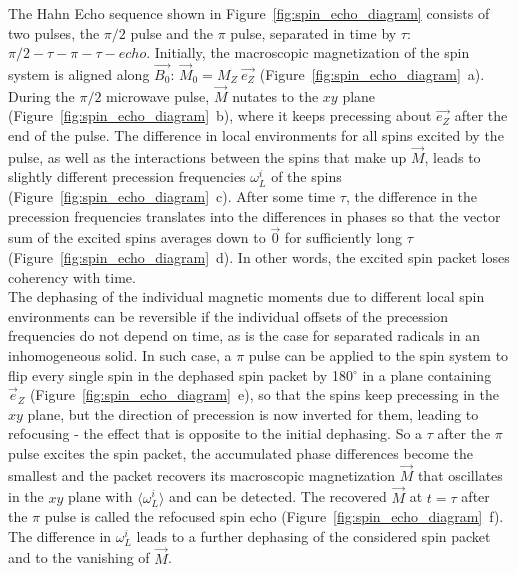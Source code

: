 The Hahn Echo sequence shown in Figure~\ref{fig:spin_echo_diagram} consists of two pulses, the $\pi/2$ pulse and the $\pi$ pulse, separated in time by $\tau$: $\pi/2 - \tau - \pi - \tau - echo$. Initially, the macroscopic magnetization of the spin system is aligned along $\vec{B_0}$: $\vec{M}_0=M_Z~\vec{e_Z}$ (Figure~\ref{fig:spin_echo_diagram}~a). During the $\pi/2$ microwave pulse, $\vec{M}$ nutates to the $xy$ plane (Figure~\ref{fig:spin_echo_diagram}~b), where it keeps precessing about $\vec{e_Z}$ after the end of the pulse. The difference in local environments for all spins excited by the pulse, as well as the interactions between the spins that make up $\vec{M}$, leads to slightly different precession frequencies $\omega_L^i$ of the spins (Figure~\ref{fig:spin_echo_diagram}~c). After some time $\tau$, the difference in the precession frequencies translates into the differences in phases so that the vector sum of the excited spins averages down to $\vec{0}$ for sufficiently long $\tau$ (Figure~\ref{fig:spin_echo_diagram}~d). In other words, the excited spin packet loses coherency with time.\\ 
The dephasing of the individual magnetic moments due to different local spin environments can be reversible if the individual offsets of the precession frequencies do not depend on time, as is the case for separated radicals in an inhomogeneous solid. In such case, a $\pi$ pulse can be applied to the spin system to flip every single spin in the dephased spin packet by 180$^{\circ}$ in a plane containing $\vec{e}_Z$ (Figure~\ref{fig:spin_echo_diagram}~e), so that the spins keep precessing in the $xy$ plane, but the direction of precession is now inverted for them, leading to refocusing - the effect that is opposite to the initial dephasing. So a $\tau$ after the $\pi$ pulse excites the spin packet, the accumulated phase differences become the smallest and the packet recovers its macroscopic magnetization $\vec{M}$ that oscillates in the $xy$ plane with $\langle\omega_L^i\rangle$ and can be detected. The recovered $\vec{M}$ at $t=\tau$ after the $\pi$ pulse is called the refocused spin echo (Figure~\ref{fig:spin_echo_diagram}~f). The difference in $\omega_L^i$ leads to a further dephasing of the considered spin packet and to the vanishing of $\vec{M}$.\\


